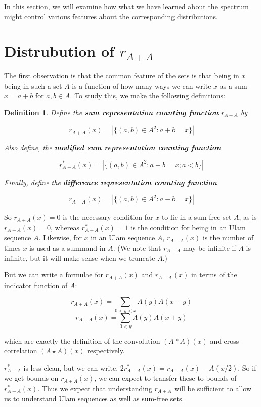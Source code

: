 \documentclass{report}
\newtheorem{definition}[theorem]{Definition}
\theoremstyle{remark}
\numberwithin{equation}{section}
\begin{document}
In this section, we will examine how what we have learned about the
spectrum might control various features about the corresponding
distributions.

\section{Distrubution of $r_{A+A}$}

The first observation is that the common feature of the \relevant sets
is that being in $x$ being in such a set $A$ is a function of how many
ways we can write $x$ as a sum $x = a+b$ for $a, b \in A$.  To study
this, we make the following definitions: 

\begin{definition}Define the \textbf{sum representation counting function}
  $r_{A+A}$ by 

  \[r_{A+A}(x) = \left|\{(a,b) \in A^2 : a+b = x\}\right|\]

  Also define, the \textbf{modified sum representation counting function}

  \[r^*_{A+A}(x) = \left|\{(a,b) \in A^2 : a+b = x ; a < b\}\right|\]

  Finally, define the \textbf{difference representation counting
    function}

  \[r_{A-A}(x) = \left|\{(a,b) \in A^2 : a-b = x\}\right|\]
\end{definition} 

So $r_{A+A}(x) = 0$ is the necessary condition for $x$ to lie in a
sum-free set $A$, as is $r_{A-A}(x) = 0$, whereas $r^*_{A+A}(x) = 1$
is the condition for being in an Ulam sequence $A$.  Likewise, for $x$
in an Ulam sequence $A$, $r_{A-A}(x)$ is the number of times $x$ is
used as a summand in $A$.  (We note that $r_{A-A}$ may be infinite if
$A$ is infinite, but it will make sense when we truncate $A$.)

But we can write a formulae for $r_{A+A}(x)$ and $r_{A-A}(x)$ in terms
of the indicator function of $A$:

\[r_{A+A}(x) = \sum_{0 < y < x} A(y)A(x-y)\]
\[r_{A-A}(x) = \sum_{0 < y} A(y)A(x+y)\]

which are exactly the definition of the convolution $(A \ast A)(x)$
and cross-correlation $(A \star A)(x)$ respectively.

$r^*_{A+A}$ is less clean, but we can write,
$2r^*_{A+A}(x) = r_{A+A}(x) - A(x/2)$.  So if we get bounds on
$r_{A+A}(x)$, we can expect to transfer these to bounds of
$r^*_{A+A}(x)$.  Thus we expect that understanding $r_{A+A}$ will be
sufficient to allow us to understand Ulam sequences as well as
sum-free sets.
\end{document}
